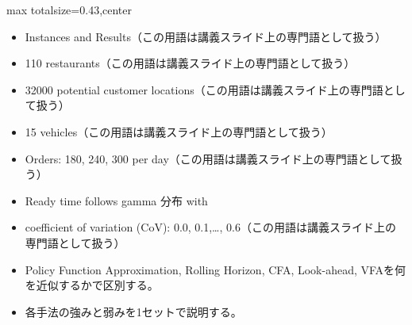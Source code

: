 \clearpage
{}
\begin{minipage}[t]{0.405\textwidth}
\begin{adjustbox}{max totalsize={\textwidth}{0.43\textheight},center}
\begin{minipage}{\textwidth}\scriptsize
{}\begin{itemize}
\item Instances and Results（この用語は講義スライド上の専門語として扱う）
\item 110 restaurants（この用語は講義スライド上の専門語として扱う）
\item 32000 potential customer locations（この用語は講義スライド上の専門語として扱う）
\item 15 vehicles（この用語は講義スライド上の専門語として扱う）
\item Orders: 180, 240, 300 per day（この用語は講義スライド上の専門語として扱う）
\item Ready time follows gamma 分布 with
\item coefficient of variation (CoV): 0.0, 0.1,…, 0.6（この用語は講義スライド上の専門語として扱う）
\end{itemize}\begin{itemize}
\item Policy Function Approximation, Rolling Horizon, CFA, Look-ahead, VFAを何を近似するかで区別する。
\item 各手法の強みと弱みを1セットで説明する。
\end{itemize}
\end{minipage}
\end{adjustbox}
\end{minipage}\hfill
